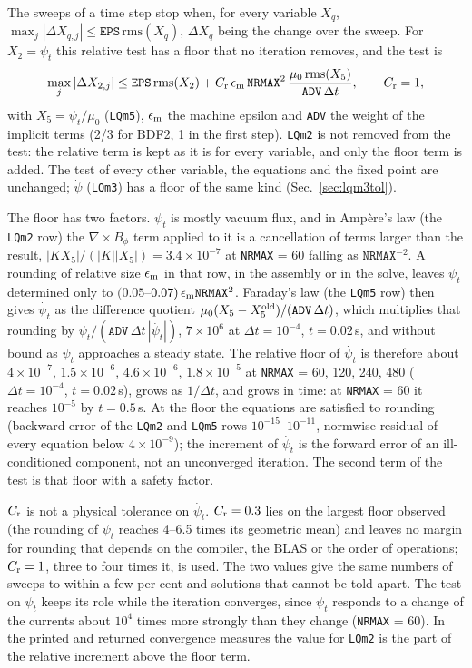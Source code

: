 \documentclass[11pt]{article}
\def\r#1{{\rm#1}}
\def\psid{\dot{\psi}}
\def\psit{\psi_t}
\def\psitd{\dot{\psit}}
\begin{document}
The sweeps of a time step stop when, for every variable $X_q$,
$\max_j|\Delta X_{q,j}| \le \texttt{EPS}\,\mathrm{rms}(X_q)$, $\Delta X_q$ being the
change over the sweep.  For $X_2 = \psitd$ this relative test has a floor that no
iteration removes, and the test is
\[
  \max_j|\Delta X_{2,j}| \le \texttt{EPS}\,\mathrm{rms}(X_2)
  + C_\r{r}\,\epsilon_\r{m}\,\texttt{NRMAX}^2\,
    \frac{\mu_0\,\mathrm{rms}(X_5)}{\texttt{ADV}\,\Delta t},
  \qquad C_\r{r} = 1,
\]
with $X_5 = \psit/\mu_0$ (\texttt{LQm5}), $\epsilon_\r{m}$ the machine epsilon and
\texttt{ADV} the weight of the implicit terms (2/3 for BDF2, 1 in the first step).
\texttt{LQm2} is not removed from the test: the relative term is kept as it is
for every variable, and only the floor term is added.  The test of every other
variable, the equations and the fixed point are unchanged; $\psid$
(\texttt{LQm3}) has a floor of the same kind (Sec.~\ref{sec:lqm3tol}).

The floor has two factors.  $\psit$ is mostly vacuum flux, and in Amp\`ere's
law (the \texttt{LQm2} row) the $\nabla\times B_\phi$ term applied to it is a
cancellation of terms larger than the result, $|KX_5|/(|K||X_5|) = 3.4\times10^{-7}$
at \texttt{NRMAX} = 60 falling as $\texttt{NRMAX}^{-2}$.  A rounding of relative
size $\epsilon_\r{m}$ in that row, in the assembly or in the solve, leaves $\psit$
determined only to $(0.05$--$0.07)\,\epsilon_\r{m}\texttt{NRMAX}^2$.  Faraday's
law (the \texttt{LQm5} row) then gives $\psitd$ as the difference quotient
$\mu_0(X_5 - X_5^\r{old})/(\texttt{ADV}\,\Delta t)$, which multiplies that rounding
by $\psit/(\texttt{ADV}\,\Delta t\,|\psitd|)$, $7\times10^6$ at $\Delta t = 10^{-4}$,
$t = 0.02$\,s, and without bound as $\psit$ approaches a steady state.  The
relative floor of $\psitd$ is therefore about $4\times10^{-7}$, $1.5\times10^{-6}$,
$4.6\times10^{-6}$, $1.8\times10^{-5}$ at \texttt{NRMAX} = 60, 120, 240, 480
($\Delta t = 10^{-4}$, $t = 0.02$\,s), grows as $1/\Delta t$, and grows in time:
at \texttt{NRMAX} = 60 it reaches $10^{-5}$ by $t = 0.5$\,s.  At the floor the
equations are satisfied to rounding (backward error of the \texttt{LQm2} and
\texttt{LQm5} rows $10^{-15}$--$10^{-11}$, normwise residual of every equation below
$4\times10^{-9}$); the increment of $\psitd$ is the forward error of an
ill-conditioned component, not an unconverged iteration.  The second term of the
test is that floor with a safety factor.

$C_\r{r}$ is not a physical tolerance on $\psitd$.  $C_\r{r} = 0.3$ lies on the
largest floor observed (the rounding of $\psit$ reaches 4--6.5 times its geometric
mean) and leaves no margin for rounding that depends on the compiler, the BLAS or
the order of operations; $C_\r{r} = 1$, three to four times it, is used.  The two
values give the same numbers of sweeps to within a few per cent and solutions
that cannot be told apart.  The test on $\psitd$ keeps its role while the
iteration converges, since $\psitd$ responds to a change of the currents about
$10^4$ times more strongly than they change (\texttt{NRMAX} = 60).  In the printed and returned
convergence measures the value for \texttt{LQm2} is the part of the relative
increment above the floor term.
\end{document}
